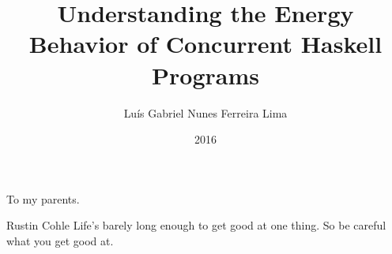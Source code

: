 \documentclass[en,oneside,onehalfspacing,msc]{risethesis}
\title{Understanding the Energy Behavior of Concurrent Haskell Programs}
\date{2016}
\author{Luís Gabriel Nunes Ferreira Lima}
\begin{document}
\frontmatter

\frontpage

\presentationpage

\begin{fichacatalografica}
  
\end{fichacatalografica}



\begin{dedicatory}
To my parents.
\end{dedicatory}

\acknowledgements


\begin{epigraph}{Rustin Cohle}
Life's barely long enough to get good at one thing.
\linebreak
So be careful what you get good at.
\end{epigraph}

\resumo


\abstract


\listoffigures

\listoftables

\lstlistoflistings

\listofacronyms


\tableofcontents

\mainmatter









\begin{references}
  
\end{references}

\theappendix

\end{document}

